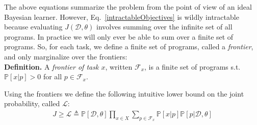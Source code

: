 \documentclass{article}
\newcommand{\lowerBound}{\mathscr{L}}
\newcommand{\probability}{\mathds{P}} %
\begin{document}



The above equations summarize the problem from the point of view of an ideal Bayesian learner.
However, Eq.~\ref{intractableObjectives}
is wildly intractable because evaluating $J(\mathcal{D},\theta)$ involves
summing over the  infinite set of all programs.
In practice we will only ever be able to sum over a finite set of programs.
So, for each task, we define a finite set of programs, called a \emph{frontier}, and only marginalize over the frontiers:
\\\noindent\textbf{Definition.} A \emph{frontier of task $x$}, written $\mathcal{F}_x$,
is a finite set of programs s.t. $\probability[x|p] > 0$ for all $p\in \mathcal{F}_x$.

Using the frontiers we  define the following intuitive lower bound on the joint probability, called $\lowerBound$:
\begin{align}
 J\geq \lowerBound\triangleq\probability[\mathcal{D},\theta]\prod_{x\in X} \sum_{p\in \mathcal{F}_x} \probability[x|p]\probability[p|\mathcal{D},\theta]
\end{align}


\end{document}
